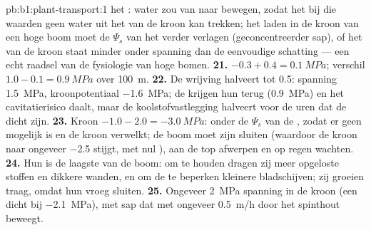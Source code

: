 \begin{solution}{pb:b1:plant-transport:1}
het : water zou van  naar  bewegen, zodat het  bij
die waarden geen water uit het  van de kroon kan trekken; het laden in
de kroon van een hoge boom moet de $\Psi_s$ van het  verder verlagen
(geconcentreerder sap), of het  van de kroon staat minder onder
spanning dan de eenvoudige schatting --- een echt raadsel van de fysiologie
van hoge bomen.
\textbf{21.} $-0.3 + 0.4 = \qty{0.1}{MPa}$; verschil $1.0 - 0.1 =
\qty{0.9}{MPa}$ over \qty{100}{m}.
\textbf{22.} De wrijving halveert tot \qty{0.5}{}: spanning \qty{1.5}{MPa},
kroonpotentiaal \qty{-1.6}{MPa}; de  krijgen hun  terug
(\qty{0.9}{MPa}) en het cavitatierisico daalt, maar de koolstofvastlegging
halveert voor de uren dat de  dicht zijn.
\textbf{23.} Kroon $-1.0 - 2.0 = \qty{-3.0}{MPa}$: onder de $\Psi_s$ van de
, zodat er geen  mogelijk is en de kroon verwelkt; de boom
moet zijn  sluiten (waardoor de kroon naar ongeveer
\qty{-2.5}{} stijgt, met nul ),  aan de top afwerpen en op
regen wachten.
\textbf{24.} Hun  is de laagste van de boom: om  te
houden dragen zij meer opgeloste stoffen en dikkere wanden, en om de
 te beperken kleinere bladschijven; zij groeien traag, omdat hun
 vroeg sluiten.
\textbf{25.} Ongeveer \qty{2}{MPa} spanning in de kroon (een
 dicht bij \qty{-2.1}{MPa}), met sap dat met ongeveer
\qty{0.5}{m/h} door het spinthout beweegt.
\end{solution}

